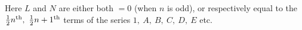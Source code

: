 \expandafter\def\csname HistoricalNoteText28\endcsname{Here \(L\) and \(N\) are either both \(=0\) (when \(n\) is odd), or respectively equal to the \(\frac12n^{\mathrm{th}},\ \frac12n+\nobreak{}1^{\mathrm{th}}\) terms of the series
\(1,\ A,\ B,\ C,\ D,\ E\) etc.}
